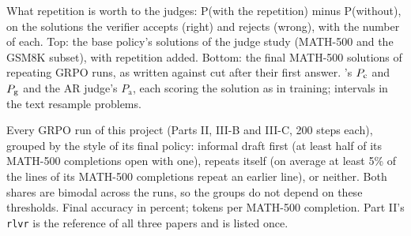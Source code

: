 \begin{table}[t]
\centering\small

\caption{What repetition is worth to the judges: P(with the repetition) minus P(without), on the solutions the
verifier accepts (right) and rejects (wrong), with the number of each. Top: the base policy's solutions of the judge
study (MATH-500 and the GSM8K subset), with repetition added. Bottom: the final MATH-500 solutions of repeating GRPO runs,
as written against cut after their first answer. \kev{}'s $\pc$ and $\pg$ and the AR judge's $P_{\mathrm{a}}$, each
scoring the solution as in training; intervals in the text resample problems.}
\label{tab:repeat-probe}
\end{table}

\begin{table}[p]
\centering\small

\caption{Every GRPO run of this project (Parts II, III-B and III-C, 200 steps each), grouped by the style of its final
policy: informal draft first (at least half of its MATH-500 completions open with one), repeats itself (on average at
least 5\% of the lines of its MATH-500 completions repeat an earlier line), or neither. Both shares are bimodal across
the runs, so the groups do not depend on these thresholds. Final accuracy in percent; tokens per MATH-500 completion.
Part II's \texttt{rlvr} is the reference of all three papers and is listed once.}
\label{tab:modes-all}
\end{table}
